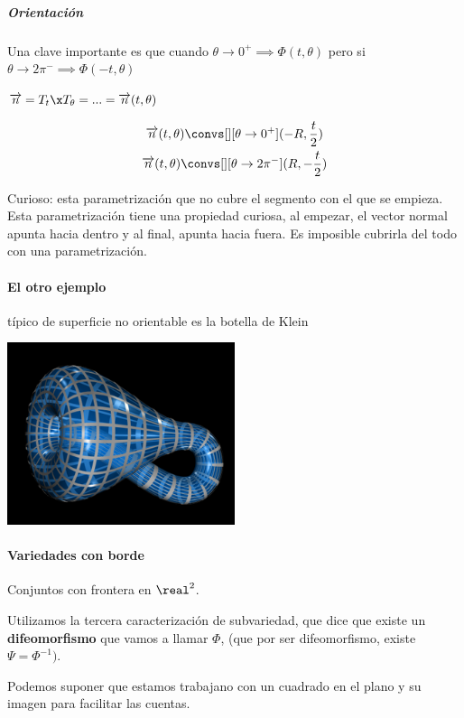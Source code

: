\subparagraph{Orientación}

Una clave importante es que cuando $\theta\rightarrow 0^+ \implies \Phi(t,\theta)$ pero si $\theta\rightarrow 2\pi^{-} \implies \Phi(-t,\theta)$

$\overrightarrow{n} = T_t\x T_{\theta} = ... = \overrightarrow{n}(t,\theta)$

\begin{gather*}
\overrightarrow{n}(t,\theta) \convs[][\theta\rightarrow 0^+] (-R,\frac{t}{2})\\
\overrightarrow{n}(t,\theta) \convs[][\theta\rightarrow 2\pi^-] (R,-\frac{t}{2})
\end{gather*}

Curioso: esta parametrización que no cubre el segmento con el que se empieza. Esta parametrización tiene una propiedad curiosa, al empezar, el vector normal apunta hacia dentro y al final, apunta hacia fuera. Es imposible cubrirla del todo con una parametrización.

\paragraph{El otro ejemplo} típico de superficie no orientable es la botella de Klein

\begin{center}
\includegraphics[width=0.5\textwidth]{botella-de-klein.png}
\end{center}


\paragraph{Variedades con borde}

Conjuntos con frontera en $\real^2$.

Utilizamos la tercera caracterización de subvariedad, que dice que existe un \textbf{difeomorfismo} que vamos a llamar $\Phi$, (que por ser difeomorfismo, existe $\Psi = \Phi^{-1})$.

Podemos suponer que estamos trabajano con un cuadrado en el plano y su imagen para facilitar las cuentas.

